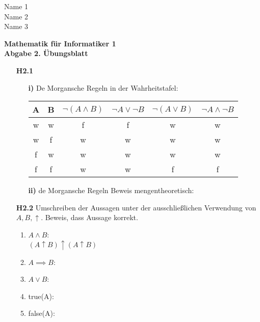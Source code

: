 \documentclass[a4paper,abstract,german]{scrreprt}
\begin{document}
\noindent
{\begin{flushright}
%
%	
Name 1\\
Name 2\\
Name 3
\end{flushright}}
\begin{center}
	{\textbf  {Mathematik für Informatiker 1}} \\
	{\textbf {Abgabe 2. Übungsblatt}}
\end{center}\vspace{0.3cm}

%
%
\begin{enumerate}
	
	
	\item[\textbf {H2.1}]
	\begin{enumerate}
	\item[\textbf {i)}]
    	De Morgansche Regeln in der Wahrheitstafel: \\
    	\begin{center}
        \begin{tabular}{||c c | c c | c c ||}
         A & B & $\neg (A \land B)$ & $\neg A \lor \neg B$ & $\neg (A \lor B)$ & $\neg A \land \neg B $ \\
         \hline
         w & w & f & f & w & w\\
         w & f & w & w & w & w\\
         f & w & w & w & w & w\\
         f & f & w & w & f & f\\
        \end{tabular}
        \end{center}
    \item[\textbf {ii)}]
        de Morgansche Regeln Beweis mengentheoretisch:

	\end{enumerate}
	\item[\textbf {H2.2}]
	Umschreiben der Aussagen unter der ausschließlichen Verwendung von $A, B, \uparrow$. Beweis, dass Aussage korrekt.
	\begin{enumerate}
	\item
    	$ A \land B$:\\
    	$(A \uparrow B) \uparrow(A \uparrow B)$
    \item
    	$ A \implies B$:\\
    \item
    	$ A \lor B$:\\
    \item
    	true(A):\\
    \item
    	false(A):\\


\end{enumerate}
\end{enumerate}
\end{document}
